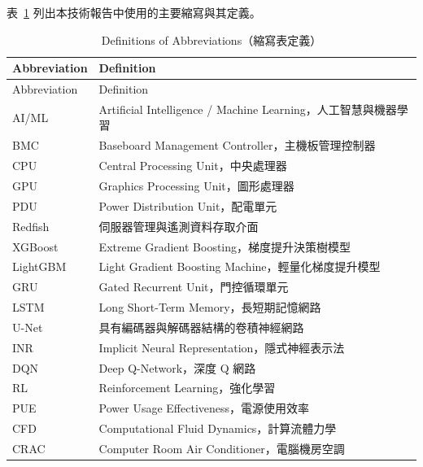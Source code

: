 \documentclass[12pt,a4paper]{article}
\begin{document}
表~\ref{tab:abbreviations} 列出本技術報告中使用的主要縮寫與其定義。
\begin{longtable}{p{} p{}}
\caption{Definitions of Abbreviations（縮寫表定義）}
\label{tab:abbreviations}\\

\toprule
Abbreviation & Definition \\
\midrule
\endfirsthead

\toprule
Abbreviation & Definition \\
\midrule
\endhead

AI/ML & Artificial Intelligence / Machine Learning，人工智慧與機器學習 \\

BMC & Baseboard Management Controller，主機板管理控制器 \\

CPU & Central Processing Unit，中央處理器 \\

GPU & Graphics Processing Unit，圖形處理器 \\

PDU & Power Distribution Unit，配電單元 \\

Redfish & 伺服器管理與遙測資料存取介面 \\

XGBoost & Extreme Gradient Boosting，梯度提升決策樹模型 \\

LightGBM & Light Gradient Boosting Machine，輕量化梯度提升模型 \\

GRU & Gated Recurrent Unit，門控循環單元 \\

LSTM & Long Short-Term Memory，長短期記憶網路 \\

U-Net & 具有編碼器與解碼器結構的卷積神經網路 \\

INR & Implicit Neural Representation，隱式神經表示法 \\

DQN & Deep Q-Network，深度 Q 網路 \\

RL & Reinforcement Learning，強化學習 \\

PUE & Power Usage Effectiveness，電源使用效率 \\

CFD & Computational Fluid Dynamics，計算流體力學 \\

CRAC & Computer Room Air Conditioner，電腦機房空調 \\

\bottomrule
\end{longtable}
\end{document}
